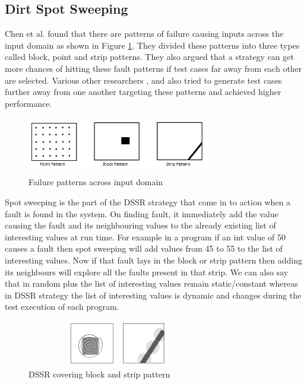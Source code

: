 \documentclass[conference]{IEEEtran}
\begin{document}
\subsection{Dirt Spot Sweeping}
Chen et al. \cite{Chen2008} found that there are patterns of failure causing inputs across the input domain as shown in Figure \ref{fig:patterns}. They divided these patterns into three types called block, point and strip patterns. They also argued that a strategy can get more chances of hitting these fault patterns if test cases far away from each other are selected. Various other researchers \cite{Chan2002}, \cite{Chen2003} and \cite{Chen2005} also tried to generate test cases further away from one another targeting these patterns and achieved higher performance.\\
\begin{figure}[ht]                                    
\centering
\includegraphics[width= 8cm,height=2.5cm]{ART_Patterns.png}
\caption{Failure patterns across input domain \cite{Chen2008}}
\label{fig:patterns}
\end{figure}

Spot sweeping is the part of the DSSR strategy that come in to action when a fault is found in the system. On finding fault, it immediately add the value causing the fault and its neighbouring values to the already existing list of interesting values at run time. For example in a program if an int value of 50 causes a fault then spot sweeping will add values from 45 to 55 to the list of interesting values. Now if that fault lays in the block or strip pattern then adding its neighbours will explore all the faults present in that strip. We can also say that in random plus the list of interesting values remain static/constant whereas in DSSR strategy the list of interesting values is dynamic and changes during the test execution of each program.\\

\begin{figure}[ht]
\centering
\includegraphics[width=8cm,height=2cm]{block2.png}
\caption{DSSR covering block and strip pattern}
\label{fig:block2}
\end{figure}
\end{document}

